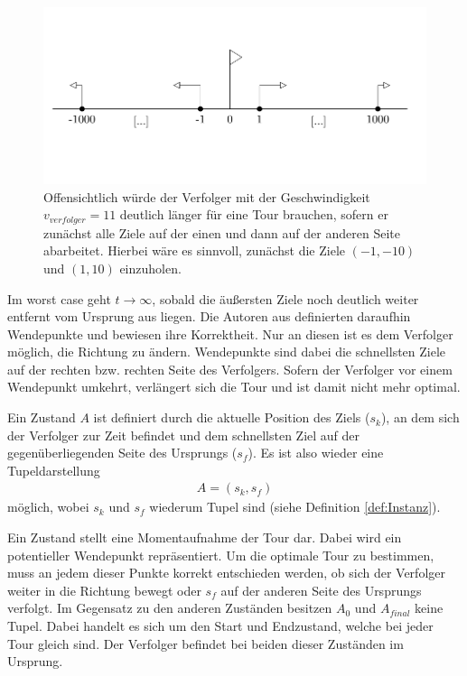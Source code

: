 \documentclass[german,version-2019-11]{uzl-thesis}
\begin{document}
\begin{figure}[htbp]
\centering
\includegraphics[scale=0.68]{../Grafiken/Verwendete/1DGegenbsp.PNG}
\caption{Offensichtlich würde der Verfolger mit der Geschwindigkeit $v_{verfolger}=11$ deutlich länger für eine Tour brauchen, sofern er zunächst alle Ziele auf der einen und dann auf der anderen Seite abarbeitet. Hierbei wäre es sinnvoll, zunächst die Ziele $(-1,-10)$ und $(1,10)$ einzuholen.}
\label{fig:GegenBsp1Dim}
\end{figure}
Im worst case geht $t\rightarrow\infty$, sobald die äußersten Ziele noch deutlich weiter entfernt vom Ursprung aus liegen. Die Autoren aus \cite{helvig} definierten daraufhin Wendepunkte und bewiesen ihre Korrektheit. Nur an diesen ist es dem Verfolger möglich, die Richtung zu ändern. Wendepunkte sind dabei die schnellsten Ziele auf der rechten bzw. rechten Seite des Verfolgers. Sofern der Verfolger vor einem Wendepunkt umkehrt, verlängert sich die Tour und ist damit nicht mehr optimal.
\begin{definition}
Ein Zustand $A$ ist definiert durch die aktuelle Position des Ziels ($s_k$), an dem sich der Verfolger zur Zeit befindet und dem schnellsten Ziel auf der gegenüberliegenden Seite des Ursprungs ($s_f$). Es ist also wieder eine Tupeldarstellung
\begin{align*}
A = (s_k, s_f)
\end{align*}
möglich, wobei $s_k$ und $s_f$ wiederum Tupel sind (siehe Definition \ref{def:Instanz}).
\end{definition}\noindent
Ein Zustand stellt eine Momentaufnahme der Tour dar. Dabei wird ein potentieller Wendepunkt repräsentiert. Um die optimale Tour zu bestimmen, muss an jedem dieser Punkte korrekt entschieden werden, ob sich der Verfolger weiter in die Richtung bewegt oder $s_f$ auf der anderen Seite des Ursprungs verfolgt. Im Gegensatz zu den anderen Zuständen besitzen $A_0$ und $A_{final}$ keine Tupel. Dabei handelt es sich um den Start und Endzustand, welche bei jeder Tour gleich sind. Der Verfolger befindet bei beiden dieser Zuständen im Ursprung. 
\end{document}
